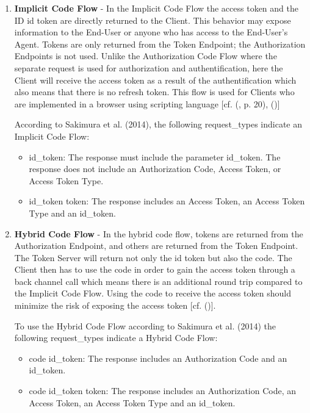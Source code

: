 {{\begin{enumerate}
			To use the Authorization Code Flow according to Sakimura et al. (2014) the following request\_type indicates a Authorization Code Flow:
			\begin{itemize}
				\item	code: The response includes an Authorization Code. 
			\end{itemize}
			
			\item \textbf{Implicit Code Flow} - In the Implicit Code Flow the access token and the ID id token are directly returned to the Client. This behavior may expose information to the End-User or anyone who has access to the End-User’s Agent. Tokens are only returned from the Token Endpoint; the Authorization Endpoints is not used. Unlike the Authorization Code Flow where the separate request is used for authorization and authentification, here the Client will receive the access token as a result of the authentification which also means that there is no refresh token.  This flow is used for Clients who are implemented in a browser using scripting language [cf. (\cite{Sakimura:2014:OpenIDConnect}, p. 20), (\cite{Hardt:2012:OAuth2})]
			
			According to Sakimura et al. (2014), the following request\_types indicate an Implicit Code Flow:
			\begin{itemize}
				\item	id\_token: The response must include the parameter id\_token. The response does not include an Authorization Code, Access Token, or Access Token Type. 
				\item  id\_token token: The response includes an Access Token, an Access Token Type and an id\_token.
			\end{itemize}
			
			\item \textbf{Hybrid Code Flow} - In the hybrid code flow, tokens are returned from the Authorization Endpoint, and others are returned from the Token Endpoint. The Token Server will return not only the id token but also the code. The Client then has to use the code in order to gain the access token through a back channel call which means there is an additional round trip compared to the Implicit Code Flow. Using the code to receive the access token should minimize the risk of exposing the access token [cf. (\cite{Sakimura:2014:OpenIDConnect})].
			
			To use the Hybrid Code Flow according to Sakimura et al. (2014) the following request\_types indicate a Hybrid Code Flow:
			\begin{itemize}
				\item	code id\_token: The response includes an Authorization Code and an id\_token.
				\item  code id\_token token: The response includes an Authorization Code, an Access Token, an Access Token Type and an id\_token. 
			\end{itemize} 
			

\end{enumerate}}}
